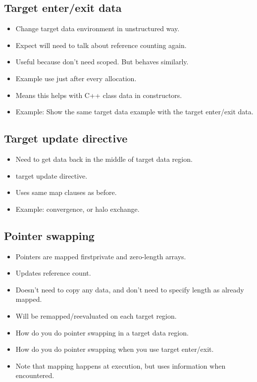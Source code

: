\subsection{Target enter/exit data}
\label{ssec:target_enter_exit_data}
\begin{itemize}
  \item Change target data environment in unstructured way.
  \item Expect will need to talk about reference counting again.
  \item Useful because don't need scoped. But behaves similarly.
  \item Example use just after every allocation.
  \item Means this helps with C++ class data in constructors.
  \item Example: Show the same target data example with the target enter/exit data.
\end{itemize}

\subsection{Target update directive}
\label{ssec:target_update}
\begin{itemize}
  \item Need to get data back in the middle of target data region.
  \item target update directive.
  \item Uses same map clauses as before.
  \item Example: convergence, or halo exchange.
\end{itemize}

\subsection{Pointer swapping}
\begin{itemize}
  \item Pointers are mapped firstprivate and zero-length arrays.
  \item Updates reference count.
  \item Doesn't need to copy any data, and don't need to specify length as already mapped.
  \item Will be remapped/reevaluated on each target region.
  \item How do you do pointer swapping in a target data region.
  \item How do you do pointer swapping when you use target enter/exit.
  \item Note that mapping happens at execution, but uses information when encountered.
\end{itemize}

